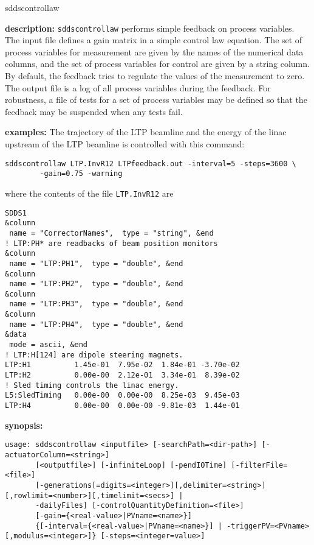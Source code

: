 \begin{sddsprog}{sddscontrollaw}
\item \textbf{description:}
\verb+sddscontrollaw+ performs simple feedback on process variables.
The input file defines a gain matrix in a simple control law equation. The set of process variables for
measurement are given by the names of the numerical data columns, and the set
of process variables for control are given by a string column. By default,
the feedback tries to regulate the values of the measurement to zero.
The output file is a log of all process variables during the feedback.
For robustness, a file of tests for a set of process variables may be defined
so that the feedback may be suspended when any tests fail.

\item \textbf{examples:}
The trajectory of the LTP beamline and the energy of the linac upstream of the LTP
beamline is controlled with this command:
\begin{verbatim}
sddscontrollaw LTP.InvR12 LTPfeedback.out -interval=5 -steps=3600 \
        -gain=0.75 -warning
\end{verbatim}
where the contents of the file \verb+LTP.InvR12+ are
\begin{verbatim}
SDDS1
&column
 name = "CorrectorNames",  type = "string", &end
! LTP:PH* are readbacks of beam position monitors
&column
 name = "LTP:PH1",  type = "double", &end
&column
 name = "LTP:PH2",  type = "double", &end
&column
 name = "LTP:PH3",  type = "double", &end
&column
 name = "LTP:PH4",  type = "double", &end
&data
 mode = ascii, &end
! LTP:H[124] are dipole steering magnets.
LTP:H1          1.45e-01  7.95e-02  1.84e-01 -3.70e-02
LTP:H2          0.00e-00  2.12e-01  3.34e-01  8.39e-02
! Sled timing controls the linac energy.
L5:SledTiming   0.00e-00  0.00e-00  8.25e-03  9.45e-03
LTP:H4          0.00e-00  0.00e-00 -9.81e-03  1.44e-01
\end{verbatim}
\item \textbf{synopsis:}
\begin{verbatim}
usage: sddscontrollaw <inputfile> [-searchPath=<dir-path>] [-actuatorColumn=<string>]
       [<outputfile>] [-infiniteLoop] [-pendIOTime] [-filterFile=<file>]
       [-generations[=digits=<integer>][,delimiter=<string>][,rowlimit=<number>][,timelimit=<secs>] |
       -dailyFiles] [-controlQuantityDefinition=<file>]
       [-gain={<real-value>|PVname=<name>}]
       {[-interval={<real-value>|PVname=<name>}] | -triggerPV=<PVname>[,modulus=<integer>]} [-steps=<integer=value>]

\end{verbatim}
\end{sddsprog}
